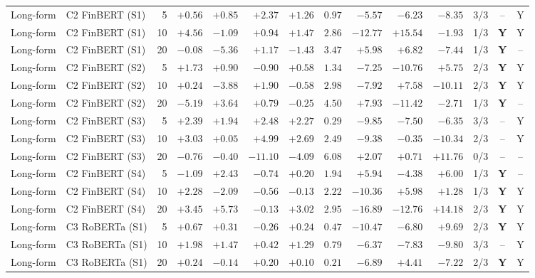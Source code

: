 \begin{table}[p]
\begin{tabular}{@{}llrrrrrrrrrrcc@{}}
Long-form & C2 FinBERT (S1) & 5 & $+0.56$ & $+0.85$ & $+2.37$ & $+1.26$ & $0.97$ & $-5.57$ & $-6.23$ & $-8.35$ & 3/3 & -- & Y \\
Long-form & C2 FinBERT (S1) & 10 & $+4.56$ & $-1.09$ & $+0.94$ & $+1.47$ & $2.86$ & $-12.77$ & $+15.54$ & $-1.93$ & 1/3 & \textbf{Y} & Y \\
Long-form & C2 FinBERT (S1) & 20 & $-0.08$ & $-5.36$ & $+1.17$ & $-1.43$ & $3.47$ & $+5.98$ & $+6.82$ & $-7.44$ & 1/3 & \textbf{Y} & -- \\
Long-form & C2 FinBERT (S2) & 5 & $+1.73$ & $+0.90$ & $-0.90$ & $+0.58$ & $1.34$ & $-7.25$ & $-10.76$ & $+5.75$ & 2/3 & \textbf{Y} & Y \\
Long-form & C2 FinBERT (S2) & 10 & $+0.24$ & $-3.88$ & $+1.90$ & $-0.58$ & $2.98$ & $-7.92$ & $+7.58$ & $-10.11$ & 2/3 & \textbf{Y} & Y \\
Long-form & C2 FinBERT (S2) & 20 & $-5.19$ & $+3.64$ & $+0.79$ & $-0.25$ & $4.50$ & $+7.93$ & $-11.42$ & $-2.71$ & 1/3 & \textbf{Y} & -- \\
Long-form & C2 FinBERT (S3) & 5 & $+2.39$ & $+1.94$ & $+2.48$ & $+2.27$ & $0.29$ & $-9.85$ & $-7.50$ & $-6.35$ & 3/3 & -- & Y \\
Long-form & C2 FinBERT (S3) & 10 & $+3.03$ & $+0.05$ & $+4.99$ & $+2.69$ & $2.49$ & $-9.38$ & $-0.35$ & $-10.34$ & 2/3 & -- & Y \\
Long-form & C2 FinBERT (S3) & 20 & $-0.76$ & $-0.40$ & $-11.10$ & $-4.09$ & $6.08$ & $+2.07$ & $+0.71$ & $+11.76$ & 0/3 & -- & -- \\
Long-form & C2 FinBERT (S4) & 5 & $-1.09$ & $+2.43$ & $-0.74$ & $+0.20$ & $1.94$ & $+5.94$ & $-4.38$ & $+6.00$ & 1/3 & \textbf{Y} & -- \\
Long-form & C2 FinBERT (S4) & 10 & $+2.28$ & $-2.09$ & $-0.56$ & $-0.13$ & $2.22$ & $-10.36$ & $+5.98$ & $+1.28$ & 1/3 & \textbf{Y} & Y \\
Long-form & C2 FinBERT (S4) & 20 & $+3.45$ & $+5.73$ & $-0.13$ & $+3.02$ & $2.95$ & $-16.89$ & $-12.76$ & $+14.18$ & 2/3 & \textbf{Y} & Y \\
Long-form & C3 RoBERTa (S1) & 5 & $+0.67$ & $+0.31$ & $-0.26$ & $+0.24$ & $0.47$ & $-10.47$ & $-6.80$ & $+9.69$ & 2/3 & \textbf{Y} & Y \\
Long-form & C3 RoBERTa (S1) & 10 & $+1.98$ & $+1.47$ & $+0.42$ & $+1.29$ & $0.79$ & $-6.37$ & $-7.83$ & $-9.80$ & 3/3 & -- & Y \\
Long-form & C3 RoBERTa (S1) & 20 & $+0.24$ & $-0.14$ & $+0.20$ & $+0.10$ & $0.21$ & $-6.89$ & $+4.41$ & $-7.22$ & 2/3 & \textbf{Y} & Y \\

\end{tabular}
\end{table}

